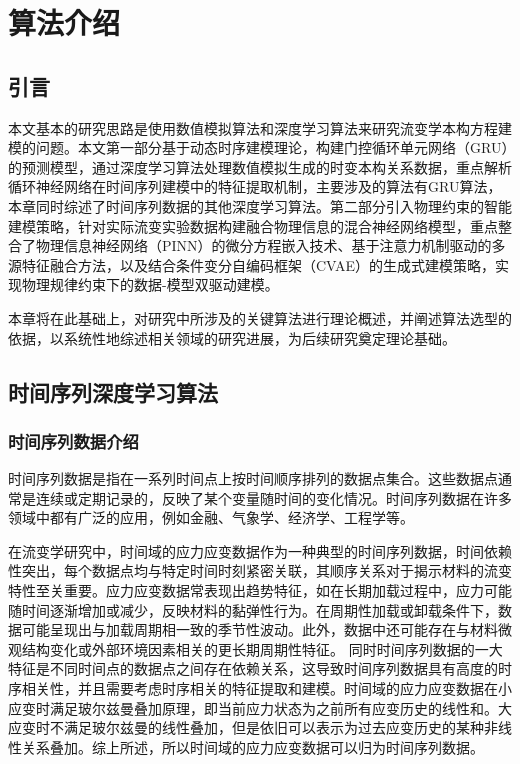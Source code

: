 \chapter{算法介绍}
\section{引言}
本文基本的研究思路是使用数值模拟算法和深度学习算法来研究流变学本构方程建模的问题。本文第一部分基于动态时序建模理论，构建门控循环单元网络（GRU）的预测模型，通过深度学习算法处理数值模拟生成的时变本构关系数据，重点解析循环神经网络在时间序列建模中的特征提取机制，主要涉及的算法有GRU算法，本章同时综述了时间序列数据的其他深度学习算法。第二部分引入物理约束的智能建模策略，针对实际流变实验数据构建融合物理信息的混合神经网络模型，重点整合了物理信息神经网络（PINN）的微分方程嵌入技术、基于注意力机制驱动的多源特征融合方法，以及结合条件变分自编码框架（CVAE）的生成式建模策略，实现物理规律约束下的数据-模型双驱动建模。

本章将在此基础上，对研究中所涉及的关键算法进行理论概述，并阐述算法选型的依据，以系统性地综述相关领域的研究进展，为后续研究奠定理论基础。
\section{时间序列深度学习算法}
\subsection{时间序列数据介绍}
时间序列数据是指在一系列时间点上按时间顺序排列的数据点集合。这些数据点通常是连续或定期记录的，反映了某个变量随时间的变化情况。时间序列数据在许多领域中都有广泛的应用，例如金融、气象学、经济学、工程学等。

在流变学研究中，时间域的应力应变数据作为一种典型的时间序列数据，时间依赖性突出，每个数据点均与特定时间时刻紧密关联，其顺序关系对于揭示材料的流变特性至关重要。应力应变数据常表现出趋势特征，如在长期加载过程中，应力可能随时间逐渐增加或减少，反映材料的黏弹性行为。在周期性加载或卸载条件下，数据可能呈现出与加载周期相一致的季节性波动。此外，数据中还可能存在与材料微观结构变化或外部环境因素相关的更长期周期性特征\cite{ewoldtDesigningComplexFluids2022}。
同时时间序列数据的一大特征是不同时间点的数据点之间存在依赖关系，这导致时间序列数据具有高度的时序相关性，并且需要考虑时序相关的特征提取和建模。时间域的应力应变数据在小应变时满足玻尔兹曼叠加原理，即当前应力状态为之前所有应变历史的线性和\cite{boltzmannZurTheorieElastischen1878}。大应变时不满足玻尔兹曼的线性叠加，但是依旧可以表示为过去应变历史的某种非线性关系叠加。综上所述，所以时间域的应力应变数据可以归为时间序列数据。
